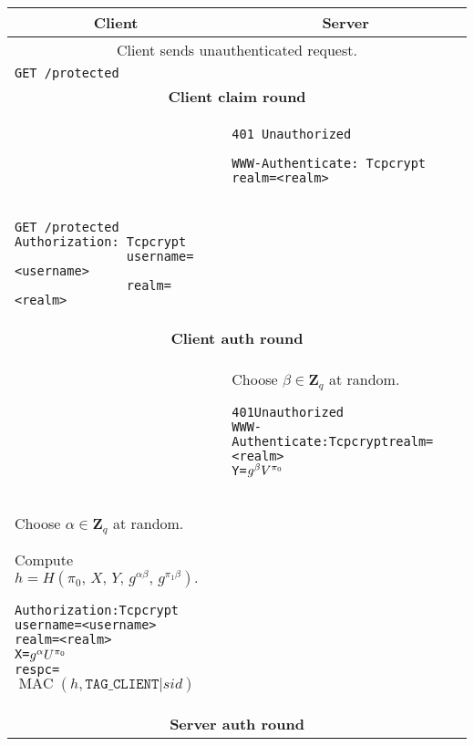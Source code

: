 \documentclass[11pt]{article}
\begin{document}
\begin{tabular}{p{8.9cm} | p{8.9cm}}
\multicolumn{1}{c}{\bf Client} & \multicolumn{1}{c}{\bf Server} \\
\hline
\multicolumn{2}{c}{Client sends unauthenticated request.} \\

{\tt GET /protected} \\

\hline
\multicolumn{2}{c}{{\bf Client claim round}} \\
& 
{\tt 401 Unauthorized}

{\tt WWW-Authenticate: Tcpcrypt realm=<realm>}
\\


\begin{verbatim}
GET /protected
Authorization: Tcpcrypt 
               username=<username>
               realm=<realm>
\end{verbatim} \\


\hline
\multicolumn{2}{c}{{\bf Client auth round}} \\

& Choose $\beta \in \mathbf{Z}_q$ at random.

\begin{alltt}
401 Unauthorized
WWW-Authenticate: Tcpcrypt realm=<realm>
                  Y=\(g\sp{\beta}V\sp{\pi\sb{0}}\)
\end{alltt} \\

Choose $\alpha \in \mathbf{Z}_q$ at random.

Compute $h = H(\pi_0,\, X,\, Y,\, g^{\alpha \beta},\, g^{\pi_1 \beta}).$

\begin{alltt}
Authorization: Tcpcrypt 
               username=<username>
               realm=<realm>
               X=\(g\sp{\alpha}U\sp{\pi\sb{0}}\)
               respc=\(\operatorname{MAC}(h,\texttt{TAG\_CLIENT}|sid)\)
\end{alltt}

& \\


\hline
\multicolumn{2}{c}{{\bf Server auth round}} \\


\end{tabular}
\end{document}
